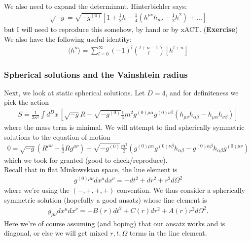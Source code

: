 \documentclass{book}
\theoremstyle{definition}
\newcommand{\f}[2]{\frac{#1}{#2}}
\newcommand{\lp}{\left(}
\newcommand{\rp}{\right)}
\newcommand{\lb}{\left[}
\newcommand{\rb}{\right]}
\begin{document}
We also need to expand the determinant. Hinterbichler says:
\begin{align}
\boxed{\sqrt{-g} = \sqrt{-g^{(0)}}\lb 1 + \f{1}{2}h - \f{1}{4}\lp h^{\mu\nu}h_{\mu\nu} - \f{1}{2}h^2 \rp + \dots \rb}
\end{align}
but I will need to reproduce this somehow, by hand or by xACT. (\textbf{Exercise})\\

We also have the following useful identity:
\begin{align}
\boxed{\langle h^n \rangle = \sum^\infty_{l=0}(-1)^l {{l+n-1}\choose{l}} [h^{l+n}]}
\end{align}







\newpage
\subsubsection{Spherical solutions and the Vainshtein radius}

Next, we look at static spherical solutions. Let $D=4$, and for definiteness we pick the action
\begin{align}
{S = \f{1}{2\kappa^2}\int d^Dx\, \lb \sqrt{-g}R - \sqrt{-g^{(0)}}\f{1}{4}m^2 g^{(0)\mu\alpha}g^{(0)\nu\beta}\lp h_{\mu\nu}h_{\alpha\beta} - h_{\mu\alpha}h_{\nu\beta} \rp \rb}
\end{align}
where the mass term is minimal. We will attempt to find spherically symmetric solutions to the equation of motion
\begin{align}
{0 = \sqrt{-g}\lp R^{\mu\nu} - \f{1}{2}Rg^{\mu\nu} \rp + \sqrt{-g^{(0)}}\f{m^2}{2}\lp g^{(0)\mu\alpha}g^{(0)\nu\beta}h_{\alpha\beta} - g^{(0)\alpha\beta}h_{\alpha\beta}g^{(0)\mu\nu}\rp}
\end{align} 
which we took for granted (good to check/reproduce). \\

Recall that in flat Minkowskian space, the line element is
\begin{align}
g^{(0)\mu\nu}dx^\mu dx^\nu = -dt^2 + dr^2 + r^2 d\Omega^2
\end{align}
where we're using the $(-,+,+,+)$ convention. We thus consider a spherically symmetric solution (hopefully a good ansatz) whose line element is
\begin{align}
g_{\mu\nu}dx^\mu dx^\nu = -B(r)dt^2 + C(r)dr^2+ A(r)r^2d\Omega^2.
\end{align}
Here we're of course assuming (and hoping) that our ansatz works and is diagonal, or else we will get mixed $r,t,\Omega$ terms in the line element. \\
\end{document}
